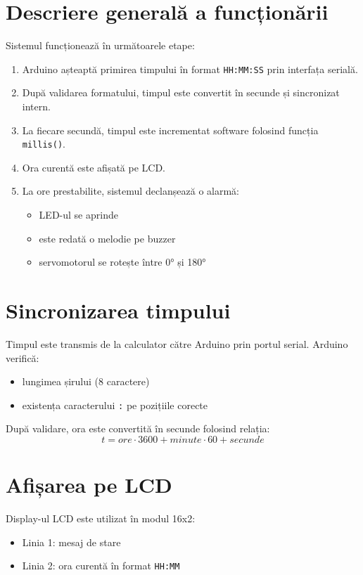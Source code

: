 \documentclass[12pt,a4paper]{article}
\begin{document}
\section{Descriere generală a funcționării}
Sistemul funcționează în următoarele etape:
\begin{enumerate}
    \item Arduino așteaptă primirea timpului în format \texttt{HH:MM:SS} prin interfața serială.
    \item După validarea formatului, timpul este convertit în secunde și sincronizat intern.
    \item La fiecare secundă, timpul este incrementat software folosind funcția \texttt{millis()}.
    \item Ora curentă este afișată pe LCD.
    \item La ore prestabilite, sistemul declanșează o alarmă:
    \begin{itemize}
        \item LED-ul se aprinde
        \item este redată o melodie pe buzzer
        \item servomotorul se rotește între 0° și 180°
    \end{itemize}
\end{enumerate}

\section{Sincronizarea timpului}
Timpul este transmis de la calculator către Arduino prin portul serial. Arduino verifică:
\begin{itemize}
    \item lungimea șirului (8 caractere)
    \item existența caracterului \texttt{:} pe pozițiile corecte
\end{itemize}

După validare, ora este convertită în secunde folosind relația:
\[
t = ore \cdot 3600 + minute \cdot 60 + secunde
\]

\section{Afișarea pe LCD}
Display-ul LCD este utilizat în modul 16x2:
\begin{itemize}
    \item Linia 1: mesaj de stare
    \item Linia 2: ora curentă în format \texttt{HH:MM}
\end{itemize}
\end{document}
